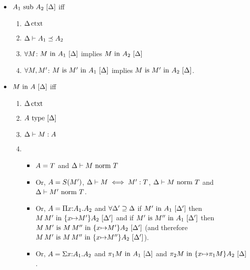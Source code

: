 \documentclass{article}
\theoremstyle{break}
\begin{document}
\begin{itemize}
\item $\semanticsubtype{\world}{\kind_1}{\kind_2}$ iff
\begin{enumerate}
\item $\semanticcontext{\world}$
\item $\subkind{\world}{\kind_1}{\kind_2}$
\item $\forall \constructor$: $\semanticvalidterm{\world}{\constructor}{\kind_1}$ implies
$\semanticvalidterm{\world}{\constructor}{\kind_2}$
\item $\forall \constructor,\constructor'$: 
$\semanticequivterm{\world}{\constructor}{\constructor'}{\kind_1}$ implies
$\semanticequivterm{\world}{\constructor}{\constructor'}{\kind_2}$.
\end{enumerate}

\item $\semanticvalidterm{\world}{\constructor}{\kind}$ iff
\begin{enumerate}
\item $\semanticcontext{\world}$
\item $\semanticvalidtype{\world}{\kind}$
\item $\validconstructor{\world}{\constructor}{\kind}$
\item 
\begin{itemize}{}
\item $\kind = \ktype$ and $\normterm{\world}{\constructor}{\ktype}$
\item Or, $\kind = \ksingleton{\constructor'}$,
$\aconequiv{\world}{\constructor}{\constructor'}{\ktype}$,
$\normterm{\world}{\constructor}{\ktype}$ and $\normterm{\world}{\constructor'}{\ktype}$.
\item Or, $\kind = \kpi{\cvar}{\kind_1}{\kind_2}$ and
$\forall \world'\supseteq\world$ if $\semanticvalidterm{\world'}{\constructor'}{\kind_1}$
then $\semanticvalidterm{\world'}{\capply{\constructor}{\constructor'}}{\substitute{\cvar}{\constructor'}{\kind_2}}$ and
if $\semanticequivterm{\world'}{\constructor'}{\constructor''}{\kind_1}$ then
$\semanticequivterm{\world'}{\capply{\constructor}{\constructor'}}{\capply{\constructor}{\constructor''}}{\substitute{\cvar}{\constructor'}{\kind_2}}$
(and therefore 
$\semanticequivterm{\world'}{\capply{\constructor}{\constructor'}}{\capply{\constructor}{\constructor''}}{\substitute{\cvar}{\constructor''}{\kind_2}}$).
\item Or, $\kind = \ksigma{\cvar}{\kind_1}{\kind_2}$ and
$\semanticvalidterm{\world}{\cpi{1}{\constructor}}{\kind_1}$ and
$\semanticvalidterm{\world}{\cpi{2}{\constructor}}{\substitute{\cvar}{\cpi{1}{\constructor}}{\kind_2}}$.
\end{itemize}
\end{enumerate}


\end{itemize}
\end{document}
